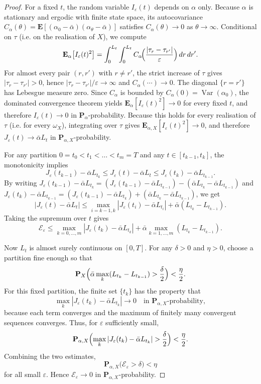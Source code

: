 \documentclass[10pt,a4paper]{amsart}
\begin{document}
\begin{proof}
	For a fixed $t$, the random variable $I_\varepsilon(t)$ depends on $\alpha$ only.
	Because $\alpha$ is stationary and ergodic with finite state space,
	its autocovariance $C_\alpha(\theta)=\mathbf E[(\alpha_0-\bar\alpha)(\alpha_\theta-\bar\alpha)]$
	satisfies $C_\alpha(\theta)\to0$ as $\theta\to\infty$.
	Conditional on $\tau$ (i.e. on the realisation of $X$), we compute
	\[
	\mathbf E_\alpha\bigl[I_\varepsilon(t)^2\bigr]
	= \int_0^{L_t}\int_0^{L_t} C_\alpha\!\Bigl(\frac{|\tau_r-\tau_{r'}|}{\varepsilon}\Bigr)\,dr\,dr'.
	\]
	For almost every pair $(r,r')$ with $r\neq r'$, the strict increase of $\tau$ gives $|\tau_r-\tau_{r'}|>0$,
	hence $|\tau_r-\tau_{r'}|/\varepsilon\to\infty$ and $C_\alpha(\cdots)\to0$.
	The diagonal $\{r=r'\}$ has Lebesgue measure zero.
	Since $C_\alpha$ is bounded by $C_\alpha(0)=\operatorname{Var}(\alpha_0)$,
	the dominated convergence theorem yields $\mathbf E_\alpha[I_\varepsilon(t)^2]\to0$ for every fixed $t$,
	and therefore $I_\varepsilon(t)\to0$ in $\mathbf P_\alpha$-probability.
	Because this holds for every realisation of $\tau$ (i.e. for every $\omega_X$), integrating over $\tau$ gives $\mathbf E_{\alpha,X}[I_\varepsilon(t)^2]\to0$, and therefore $J_\varepsilon(t)\to\bar\alpha L_t$ in $\mathbf P_{\alpha,X}$-probability.
	
	For any partition $0=t_0<t_1<\dots<t_m=T$ and any $t\in[t_{k-1},t_k]$,
	the monotonicity implies
	\[
	J_\varepsilon(t_{k-1})-\bar\alpha L_{t_k}\le J_\varepsilon(t)-\bar\alpha L_t\le
	J_\varepsilon(t_k)-\bar\alpha L_{t_{k-1}}.
	\]
	By writing \(J_\varepsilon(t_{k-1})-\bar\alpha L_{t_k} = (J_\varepsilon(t_{k-1})-\bar\alpha L_{t_{k-1}}) - (\bar\alpha L_{t_{k}}-\bar\alpha L_{t_{k-1}}) \) and \(J_\varepsilon(t_{k})-\bar\alpha L_{t_{k-1}} = (J_\varepsilon(t_{k-1})-\bar\alpha L_{t_{k}}) + (\bar\alpha L_{t_{k}}-\bar\alpha L_{t_{k-1}}) \), we get
	\[
	|J_\varepsilon(t)-\bar\alpha L_t|\le \max_{i=k-1,k}|J_\varepsilon(t_i)-\bar\alpha L_{t_i}|
	+\bar\alpha(L_{t_k}-L_{t_{k-1}}).
	\]
	Taking the supremum over $t$ gives
	\[
	\mathcal E_\varepsilon \le \max_{k=0,\dots,m}|J_\varepsilon(t_k)-\bar\alpha L_{t_k}|
	+ \bar\alpha\max_{k=1,\dots,m}(L_{t_k}-L_{t_{k-1}}).
	\]
	
	Now $L_t$ is almost surely continuous on $[0,T]$.
	For any $\delta>0$ and $\eta>0$, choose a partition fine enough so that
	\[
	\mathbf P_X\Bigl(\bar\alpha\max_k(L_{t_k}-L_{t_{k-1}})>\frac{\delta}{2}\Bigr)<\frac{\eta}{2}.
	\]
	For this fixed partition, the finite set $\{t_k\}$ has the property that
	\[
	\max_k|J_\varepsilon(t_k)-\bar\alpha L_{t_k}|\to0\quad\text{in }\mathbf P_{\alpha,X}\text{-probability},
	\]
	because each term converges and the maximum of finitely many convergent sequences converges.
	Thus, for $\varepsilon$ sufficiently small,
	\[
	\mathbf P_{\alpha,X}\Bigl(\max_k|J_\varepsilon(t_k)-\bar\alpha L_{t_k}|>\frac{\delta}{2}\Bigr)<\frac{\eta}{2}.
	\]
	Combining the two estimates,
	\[
	\mathbf P_{\alpha,X}\bigl(\mathcal E_\varepsilon>\delta\bigr)<\eta
	\]
	for all small $\varepsilon$. Hence $\mathcal E_\varepsilon\to0$ in $\mathbf P_{\alpha,X}$-probability.
	

\end{proof}
\end{document}
